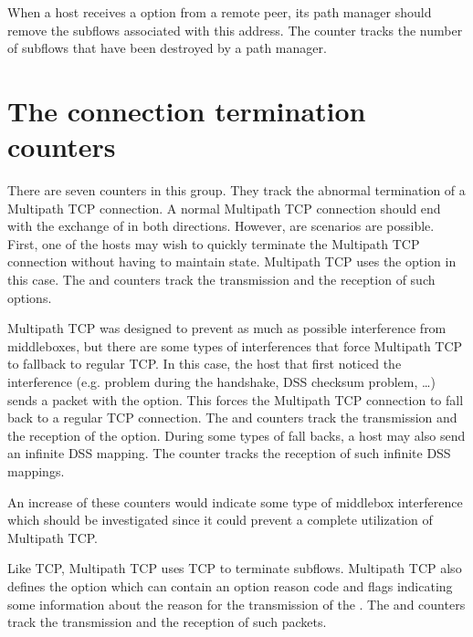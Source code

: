 \documentclass[letterpaper,10pt,english]{sphinxmanual}
\begin{document}
\sphinxAtStartPar
When a host receives a  option from a remote peer, its path
manager should remove the subflows associated with this address. The
 counter tracks the number of subflows that have
been destroyed by a path manager.


\section{The connection termination counters}
\label{\detokenize{nstat-mptcp:the-connection-termination-counters}}
\sphinxAtStartPar
There are seven counters in this group. They track the abnormal termination of
a Multipath TCP connection. A normal Multipath TCP connection should end
with the exchange of  in both directions. However, are scenarios
are possible. First, one of the hosts may wish to quickly terminate the
Multipath TCP connection without having to maintain state. Multipath TCP
uses the  option
in this case. The  and 
counters track the transmission and the reception of such options.

\sphinxAtStartPar
Multipath TCP was designed to prevent as much as possible interference
from middleboxes, but there are some types of interferences that force
Multipath TCP to fallback to regular TCP. In this case, the host that first
noticed the interference (e.g. problem during the handshake, DSS checksum
problem, …) sends a packet with the  option. This forces the
Multipath TCP connection to fall back to a regular TCP connection.
The  and  counters track the
transmission and the reception of the  option. During some
types of fall backs, a host may also send an infinite DSS mapping. The
 counter tracks the reception of such infinite
DSS mappings.

\sphinxAtStartPar
An increase of
these counters would indicate some type of middlebox interference which
should be investigated since it could prevent a complete utilization of
Multipath TCP.

\sphinxAtStartPar
Like TCP, Multipath TCP uses TCP  to terminate subflows. Multipath
TCP also defines the  option which can contain an option reason
code and flags indicating some information about the reason for the
transmission of the . The  and 
counters track the transmission and the reception of such  packets.
\end{document}
